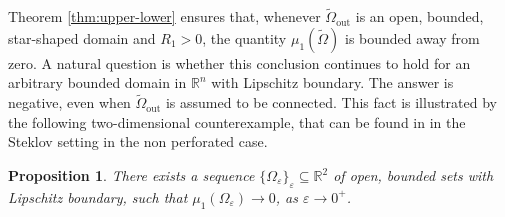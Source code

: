 \documentclass[12pt,reqno]{amsart}
\newtheorem{proposition}{Proposition}[section]
\numberwithin{equation}{section}
\numberwithin{theorem}{section}
\numberwithin{equation}{section}
\numberwithin{theorem}{section}
\begin{document}
Theorem \ref{thm:upper-lower} ensures that, whenever 
$\tilde{\Omega}_{\mathrm{out}}$ is an open, bounded, star-shaped domain and $R_1>0$, the quantity 
$\mu_1(\tilde{\Omega})$ is bounded away from zero. A natural question is whether this conclusion continues to hold for an arbitrary bounded domain in $\mathbb{R}^n$
 with Lipschitz boundary. The answer is negative, even when $\tilde{\Omega}_{\mathrm{out}}$ is assumed to be connected. This fact is illustrated by the following two-dimensional counterexample, that can be found in \cite{girouard2017spectral} in the Steklov setting in the non perforated case.
\begin{proposition}
    There exists a sequence $\{\Omega_\varepsilon\}_{\varepsilon}\subseteq \mathbb R^2$ of open, bounded sets with Lipschitz boundary, such that $\mu_1(\Omega_\varepsilon)\to 0$, as $\varepsilon\to 0^+$.
\end{proposition}
\end{document}
